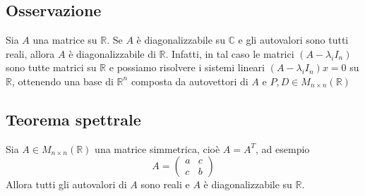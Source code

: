 \documentclass[a4paper]{article}
\theoremstyle{break}
\theoremstyle{break}
\theoremstyle{break}
\theoremstyle{break}
\begin{document}
\subsection{Osservazione}
Sia \( A \) una matrice su \( \mathbb{R} \). Se \( A \) è diagonalizzabile su \( \mathbb{C} \) 
e gli autovalori sono tutti reali, allora \( A \) è diagonalizzabile di \( \mathbb{R} \).
Infatti, in tal caso le matrici \( (A - \lambda_i I_n) \) sono tutte matrici su
\( \mathbb{R} \) e possiamo risolvere i sistemi lineari \( (A - \lambda_i I_n)x = 0 \) su
\( \mathbb{R} \), ottenendo una base di \( \mathbb{R}^n \) composta da autovettori di \( A \)
e \( P,D \in M_{n \times n}(\mathbb{R}) \) 

\subsection{Teorema spettrale}
Sia \( A \in M_{n \times n}(\mathbb{R}) \) una matrice simmetrica, cioè \( A = A^T \),
ad esempio
\[
A = \begin{pmatrix} 
  a & c\\
  c & b
\end{pmatrix} 
\] 
Allora tutti gli autovalori di \( A \) sono reali e \( A \) è diagonalizzabile su
\( \mathbb{R} \).
\end{document}
